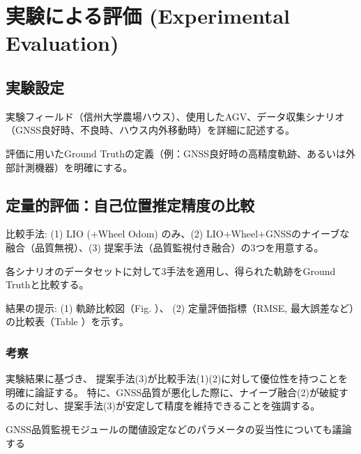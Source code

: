\documentclass[main]{subfiles}
\begin{document}
\chapter{実験による評価 (Experimental Evaluation)}

\section{実験設定}
実験フィールド（信州大学農場ハウス）、使用したAGV、データ収集シナリオ
（GNSS良好時、不良時、ハウス内外移動時）を詳細に記述する。

評価に用いたGround Truthの定義（例：GNSS良好時の高精度軌跡、あるいは外部計測機器）を明確にする。

\section{定量的評価：自己位置推定精度の比較}
比較手法: (1) LIO (+Wheel Odom) のみ、(2) LIO+Wheel+GNSSのナイーブな融合（品質無視）、(3) 提案手法（品質監視付き融合）の3つを用意する。

各シナリオのデータセットに対して3手法を適用し、得られた軌跡をGround Truthと比較する。

結果の提示: (1) 軌跡比較図（Fig. 
）、
(2) 定量評価指標（RMSE, 最大誤差など）の比較表（Table 
）を示す。

\subsection{考察} 
実験結果に基づき、
提案手法(3)が比較手法(1)(2)に対して優位性を持つことを明確に論証する。
特に、GNSS品質が悪化した際に、ナイーブ融合(2)が破綻するのに対し、提案手法(3)が安定して精度を維持できることを強調する。

GNSS品質監視モジュールの閾値設定などのパラメータの妥当性についても議論する
\end{document}
